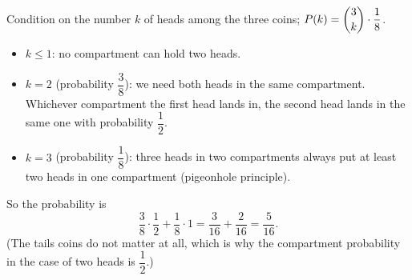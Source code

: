 Condition on the number $k$ of heads among the three coins; $P(k)=\dbinom3k\cdot\dfrac{1}{8}$.
\begin{itemize}
\item $k\le1$: no compartment can hold two heads.
\item $k=2$ (probability $\dfrac{3}{8}$): we need both heads in the same compartment. Whichever compartment the first head lands in, the second head lands in the same one with probability $\dfrac{1}{2}$.
\item $k=3$ (probability $\dfrac{1}{8}$): three heads in two compartments always put at least two heads in one compartment (pigeonhole principle).
\end{itemize}
So the probability is
\[\dfrac{3}{8}\cdot\dfrac{1}{2}+\dfrac{1}{8}\cdot1=\dfrac{3}{16}+\dfrac{2}{16}=\boxed{\dfrac{5}{16}}.\]
(The tails coins do not matter at all, which is why the compartment probability in the case of two heads is $\dfrac{1}{2}$.)
